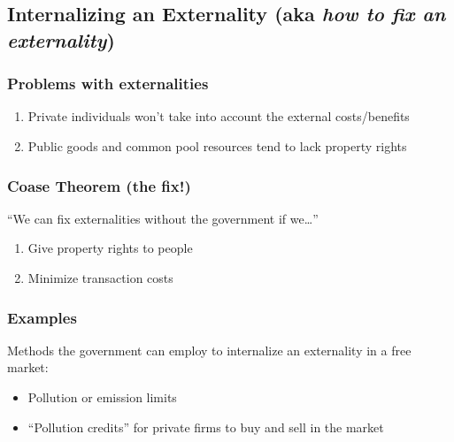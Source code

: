 \documentclass[
  letterpaper,
  DIV=11,
  numbers=noendperiod]{scrartcl}
\providecommand{\tightlist}{%
  \setlength{\itemsep}{0pt}\setlength{\parskip}{0pt}}\usepackage{longtable,booktabs,array}
\begin{document}
\hypertarget{internalizing-an-externality-aka-how-to-fix-an-externality}{%
\subsection{\texorpdfstring{Internalizing an Externality (aka \emph{how
to fix an
externality})}{Internalizing an Externality (aka how to fix an externality)}}\label{internalizing-an-externality-aka-how-to-fix-an-externality}}

\hypertarget{problems-with-externalities}{%
\subsubsection{Problems with
externalities}\label{problems-with-externalities}}

\begin{enumerate}
\def\labelenumi{\arabic{enumi})}
\tightlist
\item
  Private individuals won't take into account the external
  costs/benefits
\item
  Public goods and common pool resources tend to lack property rights
\end{enumerate}

\hypertarget{coase-theorem-the-fix}{%
\subsubsection{Coase Theorem (the fix!)}\label{coase-theorem-the-fix}}

``We can fix externalities without the government if we\ldots{}''

\begin{enumerate}
\def\labelenumi{\arabic{enumi})}
\tightlist
\item
  Give property rights to people
\item
  Minimize transaction costs
\end{enumerate}

\hypertarget{examples-1}{%
\subsubsection{Examples}\label{examples-1}}

Methods the government can employ to internalize an externality in a
free market:

\begin{itemize}
\tightlist
\item
  Pollution or emission limits
\item
  ``Pollution credits'' for private firms to buy and sell in the market
\end{itemize}
\end{document}
